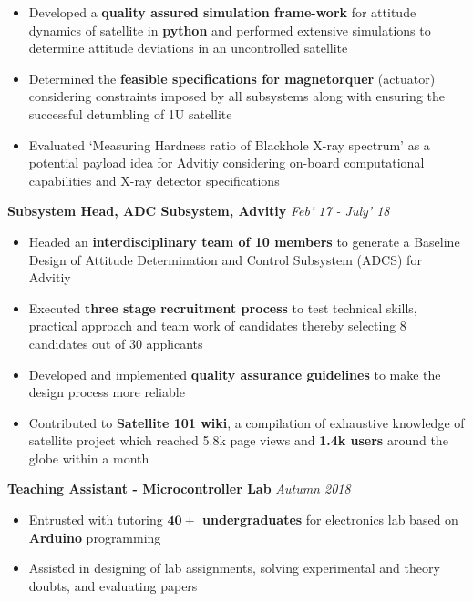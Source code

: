 \documentclass[10pt]{article}%
\newcommand{\xfilll}[2][1ex]{
\dimen0=#2\advance\dimen0 by #1
\leaders\hrule height \dimen0 depth -#1\hfill}
\begin{document}
{\begin{itemize}
    \setlength\itemsep{0.01em}
    \item Developed a \textbf{quality assured simulation frame-work} for attitude dynamics of satellite in \textbf{python} and performed
extensive simulations to determine attitude deviations in an uncontrolled satellite
    \item Determined the \textbf{feasible specifications for magnetorquer} (actuator) considering constraints imposed by all subsystems along with ensuring the successful detumbling of 1U satellite 
    \item Evaluated `Measuring Hardness ratio of Blackhole X-ray spectrum' as a potential payload idea for Advitiy considering on-board computational capabilities and X-ray detector specifications
\end{itemize}
{\flushleft \bf \large{Subsystem Head, ADC Subsystem, Advitiy}}  \hfill \textit{Feb' 17 - July' 18} \\
\begin{itemize}
\vspace{-4mm}
\setlength\itemsep{0.01em}
    \item Headed an \textbf{interdisciplinary team of 10 members} to generate a Baseline Design of Attitude Determination and Control Subsystem (ADCS) for Advitiy%
    \item Executed \textbf{three stage recruitment process} to test technical skills, practical approach and team work of candidates thereby selecting 8 candidates out of 30 applicants%
    \item Developed and implemented \textbf{quality assurance guidelines} to make the design process more reliable 
    \item Contributed to \textbf{Satellite 101 wiki}, a compilation of exhaustive knowledge of satellite project which reached 5.8k
    page views and \textbf{1.4k users} around the globe within a month%

\end{itemize}
{\flushleft \bf \large{Teaching Assistant - Microcontroller Lab}}  \hfill\textit{Autumn 2018} \\
\begin{itemize}
\vspace{-4mm}
\setlength\itemsep{0.01em}
    \item Entrusted with tutoring \textbf{$\mathbf{40+}$ undergraduates} for electronics lab based on \textbf{Arduino} programming 
    \item Assisted in designing of lab assignments, solving experimental and theory doubts, and evaluating papers
    

\end{itemize}}
\end{document}
